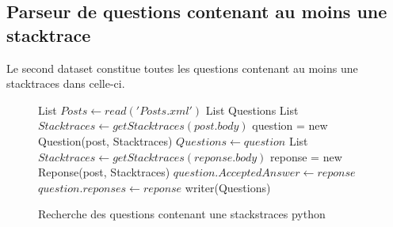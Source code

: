 \subsection{Parseur de questions contenant au moins une stacktrace}
Le second dataset constitue toutes les questions contenant au moins une stacktraces dans celle-ci.
\begin{figure}[!h]
\begin{center}
\begin{algorithmic}
	\State List $Posts \gets read('Posts.xml')$
	\State List Questions
			\State List $Stacktraces \gets getStacktraces(post.body)$
				\State question = new Question(post, Stacktraces)
				\State $Questions \gets question$
			\EndIf
		\Else {}
					\State List $Stacktraces \gets getStacktraces(reponse.body)$
					\State reponse = new Reponse(post, Stacktraces)
						\State $question.AcceptedAnswer \gets reponse$
					\Else
						\State $question.reponses \gets reponse$
					\EndIf
				\EndIf
			\EndFor
		\EndIf
		\EndIf
	\EndFor
	\State writer(Questions)
\EndFunction
\end{algorithmic}
\caption{Recherche des questions contenant une stackstraces python}
\label{Recherche des questions contenant une stackstraces python}
\end{center}
\end{figure}

